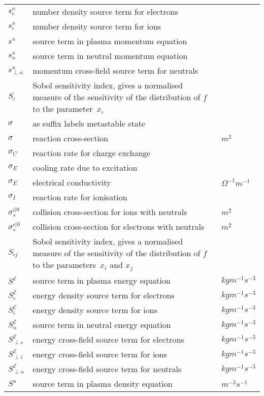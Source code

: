 \begin{longtable}{|p{3.0cm}|p{10.0cm}|p{3.0cm}|}
$s^n_{e}$ & number density source term for electrons  &  \\
$s^n_{i}$ & number density source term for ions  &  \\
$s^u$ & source term in plasma momentum equation  &  \\
$s^u_n$ & source term in neutral momentum equation   &  \\
$s^u_{\perp n}$ & momentum cross-field source term for neutrals  &  \\
$S_i$ & Sobol sensitivity index, gives a normalised measure of the sensitivity of the distribution of $f$ to the parameter~$x_i$  & \\
$\sigma$ & as suffix labels metastable state & \\
$\sigma$ & reaction cross-section  & $m^2$ \\
$\sigma_C$ & reaction rate for charge exchange  & \\
$\sigma_E$ & cooling rate due to excitation  & \\
$\sigma_E$ & electrical conductivity  & $\Omega^{-1} m^{-1}$ \\
$\sigma_I$ & reaction rate for ionisation  & \\
$\sigma_s^{i|0}$ & collision cross-section for ions with neutrals  & $m^2$ \\
$\sigma_s^{e|0}$ & collision cross-section for electrons with neutrals  & $m^2$ \\
$S_{ij}$ & Sobol sensitivity index, gives a normalised measure of the sensitivity of the distribution of $f$ to the parameters~$x_i$ and $x_j$  & \\
$S^\mathcal{E}$ & source term in plasma energy equation  & $kg m^{-1} s^{-3}$ \\
$S^{\mathcal{E}}_{e}$ & energy density source term for electrons  & $kg m^{-1} s^{-3}$ \\
$S^{\mathcal{E}}_{i}$ & energy density source term for ions  & $kg m^{-1} s^{-3}$ \\
$S^\mathcal{E}_n$ & source term in neutral energy equation  & $kg m^{-1} s^{-3}$ \\
$S^\mathcal{E}_{\perp e}$ & energy cross-field source term for electrons  & $kg m^{-1} s^{-3}$ \\
$S^\mathcal{E}_{\perp i}$ & energy cross-field source term for ions   & $kg m^{-1} s^{-3}$ \\
$S^\mathcal{E}_{\perp n}$ & energy cross-field source term for neutrals  & $kg m^{-1} s^{-3}$ \\
$S^n$ & source term in plasma density equation  & $m^{-3} s^{-1}$ \\

\end{longtable}
